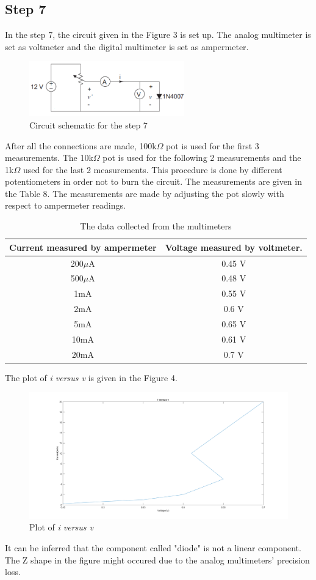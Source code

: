 \documentclass[letterpaper,12pt]{article}
\begin{document}
\subsection{Step 7}
In the step 7, the circuit given in the Figure 3 is set up. The analog multimeter is set as voltmeter and the digital multimeter is set as ampermeter.  
\begin{figure}[H]
	\caption{Circuit schematic for the step 7}
	\centering
	\includegraphics[width=0.6\textwidth]{7.png}
\end{figure} 
After all the connections are made, 100k\(\Omega\) pot is used for the first 3 measurements. The 10k\(\Omega\) pot is used for the following 2 measurements and the 1k\(\Omega\) used for the last 2 measurements. This procedure is done by different potentiometers in order not to burn the circuit. The measurements are given in the Table 8. The measurements are made by adjusting the pot slowly with respect to ampermeter readings.
\begin{table}[H]
	\centering
	\begin{tabular}{|| c | c ||}
		\hline
	Current measured by ampermeter & Voltage measured by voltmeter. \\\hline
	\hline
	200\( \mu \)A & 0.45 V \\\hline
	500\( \mu \)A & 0.48 V \\\hline
	1mA & 0.55 V \\\hline
	2mA & 0.6 V \\\hline
	5mA & 0.65 V \\\hline
	10mA & 0.61 V\\\hline
	20mA & 0.7 V \\\hline
	\end{tabular}
	\caption{The data  collected from the  multimeters}
\end{table}
The plot of \emph{i versus v} is given in the Figure 4.
\begin{figure}[H]
	\caption{Plot of \emph{i versus v}}
	\centering
	\includegraphics[width=1\textwidth]{7fig.png}
\end{figure} 
It can be inferred that the component called "diode" is not a linear component. The Z shape in the figure might occured due to the analog multimeters' precision loss. 
\end{document}
